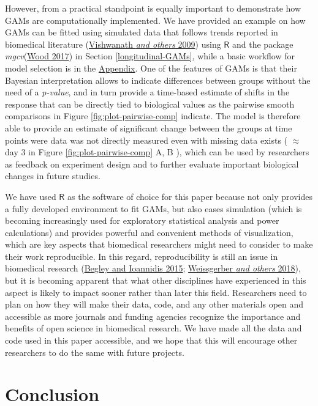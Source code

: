 \documentclass[
]{article}
\begin{document}
However, from a practical standpoint is equally important to demonstrate how GAMs are computationally implemented. We have provided an example on how GAMs can be fitted using simulated data that follows trends reported in biomedical literature (\protect\hyperlink{ref-vishwanath2009}{Vishwanath \emph{and others} 2009}) using \(\textsf{R}\) and the package \emph{mgcv}(\protect\hyperlink{ref-wood2017}{Wood 2017}) in Section \ref{longitudinal-GAMs}, while a basic workflow for model selection is in the \protect\hyperlink{workflow}{Appendix}. One of the features of GAMs is that their Bayesian interpretation allows to indicate differences between groups without the need of a \emph{p-value}, and in turn provide a time-based estimate of shifts in the response that can be directly tied to biological values as the pairwise smooth comparisons in Figure \ref{fig:plot-pairwise-comp} indicate. The model is therefore able to provide an estimate of significant change between the groups at time points were data was not directly measured even with missing data exists ( \(\approx\) day 3 in Figure \ref{fig:plot-pairwise-comp} A, B ), which can be used by researchers as feedback on experiment design and to further evaluate important biological changes in future studies.

We have used \(\textsf{R}\) as the software of choice for this paper because not only provides a fully developed environment to fit GAMs, but also eases simulation (which is becoming increasingly used for exploratory statistical analysis and power calculations) and provides powerful and convenient methods of visualization, which are key aspects that biomedical researchers might need to consider to make their work reproducible. In this regard, reproducibility is still an issue in biomedical research (\protect\hyperlink{ref-begley2015}{Begley and Ioannidis 2015}; \protect\hyperlink{ref-weissgerber2018}{Weissgerber \emph{and others} 2018}), but it is becoming apparent that what other disciplines have experienced in this aspect is likely to impact sooner rather than later this field. Researchers need to plan on how they will make their data, code, and any other materials open and accessible as more journals and funding agencies recognize the importance and benefits of open science in biomedical research. We have made all the data and code used in this paper accessible, and we hope that this will encourage other researchers to do the same with future projects.

\hypertarget{conclusion}{%
\section{Conclusion}\label{conclusion}}
\end{document}
